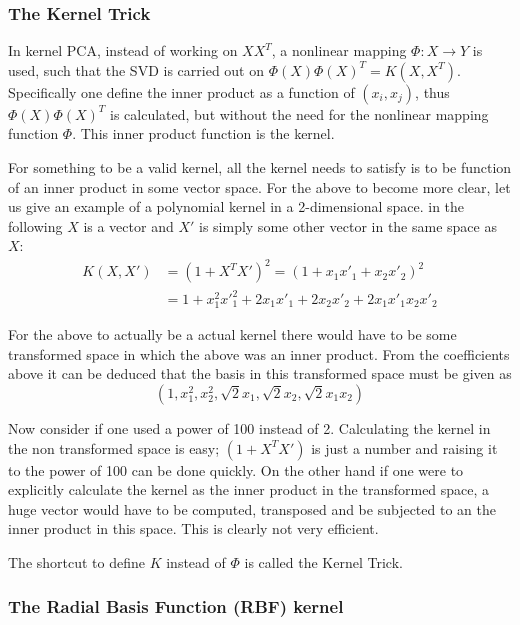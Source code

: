 \subsubsection{The Kernel Trick}

In kernel PCA, instead of working on $X X^T$, a nonlinear mapping $\Phi: X\rightarrow Y$ is used, such that the SVD is carried out on $\Phi(X)\Phi(X)^T = K(X, X^T)$. Specifically one define the inner product as a function of $(x_i, x_j)$, thus $\Phi(X)\Phi(X)^T$ is calculated, but without the need for the nonlinear mapping function $\Phi$. This inner product function is the kernel.
 
For something to be a valid kernel, all the kernel needs to satisfy is to be function of an inner product in some vector space.
For the above to become more clear, let us give an example of a polynomial kernel in a 2-dimensional space. in the following $X$ is a vector and $X'$ is simply some other vector in the same space as $X$:
\begin{equation}
\begin{split}
K(X,X') &= (1+X^T X')^2 = (1+x_1 x'_1+x_2 x'_2)^2 \\
&= 1+x_1^2 {x'}_1^2 +2 x_1 x'_1 + 2 x_2 x'_2 + 2 x_1 x'_1 x_2 x'_2
\end{split}
\end{equation}

For the above to actually be a actual kernel there would have to be some transformed space in which the above was an inner product. From the coefficients above it can be deduced that the basis in this transformed space must be given as
\begin{equation}
(1,x_1^2,x_2^2,\sqrt{2} x_1, \sqrt{2} x_2 , \sqrt{2} x_1 x_2)
\end{equation}

Now consider if one used a power of 100 instead of 2. Calculating the kernel in the non transformed  space is easy; $(1+X^T X')$ is just a number and raising it to the power of 100 can be done quickly.
On the other hand if one were to explicitly calculate the kernel as the inner product in the transformed space, a huge vector would have to be computed, transposed and be subjected to an the inner product in this space. This is clearly not very efficient.

The shortcut to define $K$ instead of $\Phi$ is called the Kernel Trick.

\subsubsection{The Radial Basis Function (RBF) kernel}

